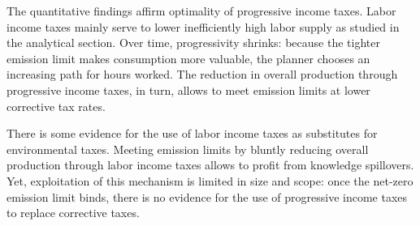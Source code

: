  

  



The quantitative findings affirm optimality of progressive income taxes. 
Labor income taxes mainly serve to lower inefficiently high labor supply as studied in the analytical section.
Over time, progressivity shrinks: because the tighter emission limit makes consumption more valuable, the planner chooses an increasing path for hours worked. The reduction in overall production through progressive income taxes, in turn, allows to meet emission limits at lower corrective tax rates. 

There is some evidence for the use of labor income taxes as substitutes for environmental taxes. Meeting emission limits by bluntly reducing overall production through labor income taxes allows to profit from knowledge spillovers. 
Yet, exploitation of this mechanism is limited in size and scope: once the net-zero emission limit binds, there is no evidence for the use of progressive income taxes to replace corrective taxes. %


